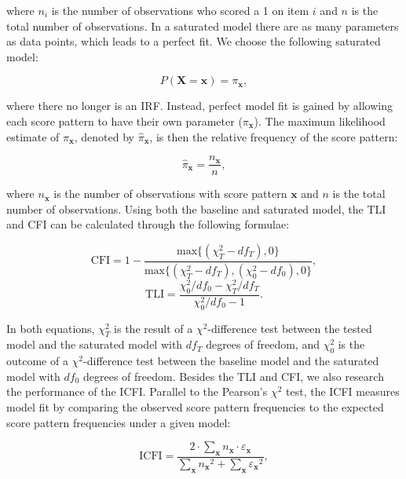 \documentclass[Royal,sageapa,times,doublespace]{sagej}
\begin{document}
where $n_i$ is the number of observations who scored a 1 on item $i$ and $n$ is the total number of observations. In a saturated model there are as many parameters as data points, which leads to a perfect fit. We choose the following saturated model:

\begin{equation}
P(\boldsymbol{X} = \boldsymbol{x}) = \pi_{\boldsymbol{x}},
\end{equation}

where there no longer is an IRF. Instead, perfect model fit is gained by allowing each score pattern to have their own parameter ($\pi_{\boldsymbol{x}}$). The maximum likelihood estimate of $\pi_{\boldsymbol{x}}$, denoted by $\hat{\pi}_{\boldsymbol{x}}$, is then the relative frequency of the score pattern:

\begin{equation*}
\hat{\pi}_{\boldsymbol{x}} = \frac{n_{\boldsymbol{x}}}{n},
\end{equation*}

where $n_{\boldsymbol{x}}$ is the number of observations with score pattern $\boldsymbol{x}$ and $n$ is the total number of observations. Using both the baseline and saturated model, the TLI and CFI can be calculated through the following formulae:

\begin{equation}
\text{CFI} = 1 - \frac{\text{max}\{(\chi^2_T - df_T), 0\}}{\text{max}\{(\chi^2_T - df_T), (\chi^2_0 - df_0), 0\}},
\end{equation}
\begin{equation}
\text{TLI} = \frac{\chi^2_0/df_0 - \chi^2_T/df_T}{\chi^2_0/df_0 - 1}.
\end{equation}

In both equations, $\chi^{2}_{T}$ is the result of a $\chi^2$-difference test between the tested model and the saturated model with $df_T$ degrees of freedom, and $\chi^{2}_{0}$ is the outcome of a $\chi^2$-difference test between the baseline model and the saturated model with $df_0$ degrees of freedom. Besides the TLI and CFI, we also research the performance of the ICFI. Parallel to the Pearson's $\chi^2$ test, the ICFI measures model fit by comparing the observed score pattern frequencies to the expected score pattern frequencies under a given model:

\begin{equation}
\text{ICFI} = \frac{2 \cdot \sum_{\boldsymbol{x}}  n_{\boldsymbol{x}} \cdot \varepsilon_{\boldsymbol{x}}  }{  \sum_{\boldsymbol{x}}  {n_{\boldsymbol{x}}}^2 +  \sum_{\boldsymbol{x}}  {\varepsilon_{\boldsymbol{x}}} ^2 },
\end{equation}
\end{document}
